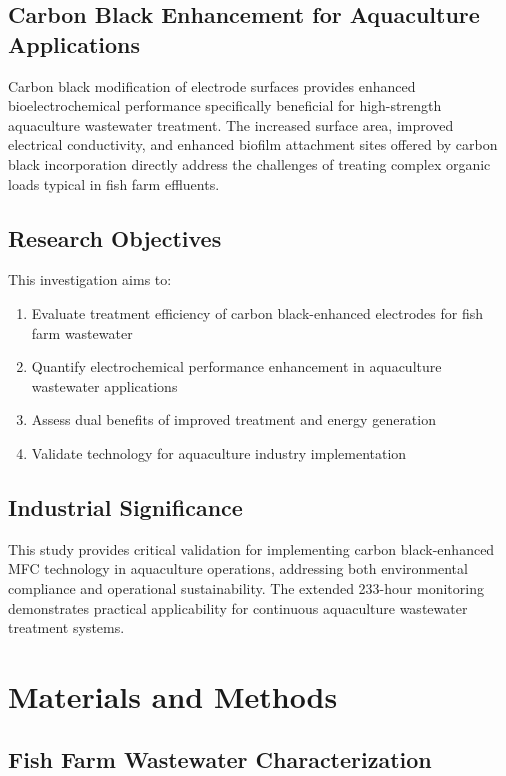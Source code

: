 \documentclass[12pt,a4paper]{article}
\begin{document}
\subsection{Carbon Black Enhancement for Aquaculture Applications}

Carbon black modification of electrode surfaces provides enhanced bioelectrochemical performance specifically beneficial for high-strength aquaculture wastewater treatment. The increased surface area, improved electrical conductivity, and enhanced biofilm attachment sites offered by carbon black incorporation directly address the challenges of treating complex organic loads typical in fish farm effluents.

\subsection{Research Objectives}

This investigation aims to:
\begin{enumerate}
    \item Evaluate treatment efficiency of carbon black-enhanced electrodes for fish farm wastewater
    \item Quantify electrochemical performance enhancement in aquaculture wastewater applications
    \item Assess dual benefits of improved treatment and energy generation
    \item Validate technology for aquaculture industry implementation
\end{enumerate}

\subsection{Industrial Significance}

This study provides critical validation for implementing carbon black-enhanced MFC technology in aquaculture operations, addressing both environmental compliance and operational sustainability. The extended 233-hour monitoring demonstrates practical applicability for continuous aquaculture wastewater treatment systems.

\section{Materials and Methods}

\subsection{Fish Farm Wastewater Characterization}
\end{document}
